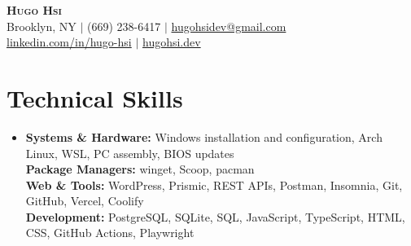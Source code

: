 \documentclass[letterpaper,11pt]{article}
\begin{document}
\begin{center}
\textbf{\Huge\scshape Hugo Hsi}\\\vspace{3pt}
\small Brooklyn, NY $|$ (669) 238-6417 $|$ \href{mailto:hugohsidev@gmail.com}{hugohsidev@gmail.com}\\\vspace{2pt}
\small \href{https://linkedin.com/in/hugo-hsi}{linkedin.com/in/hugo-hsi} $|$ \href{https://hugohsi.dev}{hugohsi.dev}
\end{center}
\vspace{-10pt}

\section{Technical Skills}
\begin{itemize}[leftmargin=0.15in,label={},topsep=2pt]
\small\item
\textbf{Systems \& Hardware:} Windows installation and configuration, Arch Linux, WSL, PC assembly, BIOS updates\\
\textbf{Package Managers:} winget, Scoop, pacman\\
\textbf{Web \& Tools:} WordPress, Prismic, REST APIs, Postman, Insomnia, Git, GitHub, Vercel, Coolify\\
\textbf{Development:} PostgreSQL, SQLite, SQL, JavaScript, TypeScript, HTML, CSS, GitHub Actions, Playwright
\end{itemize}
\end{document}
